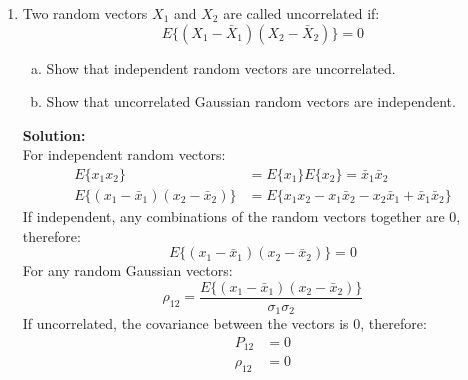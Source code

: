 \documentclass[11pt]{article}
\newcommand{\solution}{\textbf{Solution: \\}}
\begin{document}
\begin{enumerate}[label=\textbf{\arabic*.}]
  \item Two random vectors $X_1$ and $X_2$ are called uncorrelated if:
  \begin{equation*}
    E\{(X_1-\bar{X}_1)(X_2-\bar{X}_2)\} = 0
  \end{equation*}
  \begin{enumerate}[(a)]
    \itemsep -2pt
    \item Show that independent random vectors are uncorrelated.
    \item Show that uncorrelated Gaussian random vectors are independent.
  \end{enumerate}
  \solution
  For independent random vectors:
  \begin{equation*}
    \begin{split}
      E\{x_1x_2\} &= E\{x_1\}E\{x_2\} = \bar{x}_1\bar{x}_2 \\
      E\{(x_1-\bar{x}_1)(x_2-\bar{x}_2)\} &= E\{x_1x_2 - x_1\bar{x}_2 - x_2\bar{x}_1 + \bar{x}_1\bar{x}_2\}
    \end{split}
  \end{equation*}
  If independent, any combinations of the random vectors together are 0, therefore:
  \begin{equation*}
      E\{(x_1-\bar{x}_1)(x_2-\bar{x}_2)\} = 0
  \end{equation*}
  For any random Gaussian vectors:
  \begin{equation*}
    \rho_{12} = \dfrac{E\{(x_1-\bar{x}_1)(x_2-\bar{x}_2)\}}{\sigma_1\sigma_2}
  \end{equation*}
  If uncorrelated, the covariance between the vectors is 0, therefore:
  \begin{equation*}
    \begin{split}
      P_{12} &= 0 \\
      \rho_{12} &= 0
    \end{split}
  \end{equation*}


\end{enumerate}
\end{document}
